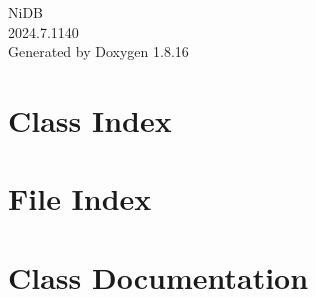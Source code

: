 \let\mypdfximage\pdfximage\def\pdfximage{\immediate\mypdfximage}\documentclass[twoside]{book}
\newcommand{\+}{\discretionary{\mbox{\scriptsize$\hookleftarrow$}}{}{}}
\newcommand{\clearemptydoublepage}{%
  \newpage{\pagestyle{empty}\cleardoublepage}%
}
\begin{document}
\hypersetup{pageanchor=false,
             bookmarksnumbered=true,
             pdfencoding=unicode
            }
\begin{titlepage}
\vspace*{7cm}
\begin{center}%
{\Large Ni\+DB \\[1ex]\large 2024.\+7.\+1140 }\\
\vspace*{1cm}
{\large Generated by Doxygen 1.8.16}\\
\end{center}
\end{titlepage}
\clearemptydoublepage
{}
\tableofcontents
\clearemptydoublepage
{}
\hypersetup{pageanchor=true}

\chapter{Class Index}

\chapter{File Index}

\chapter{Class Documentation}
































\end{document}
